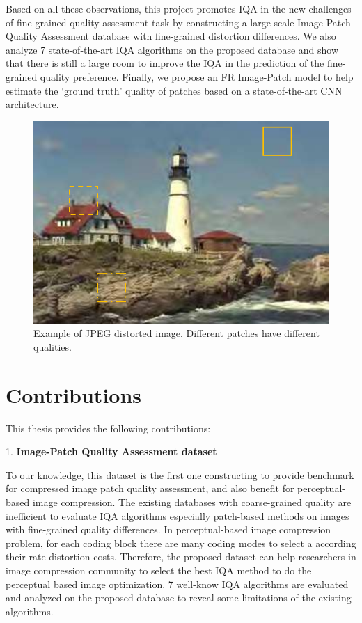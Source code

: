 Based on all these observations, this project promotes IQA in the new challenges of fine-grained quality assessment task by constructing a large-scale Image-Patch Quality Assessment database with fine-grained distortion differences. 
We also analyze 7 state-of-the-art IQA algorithms on the proposed database and show that there is still a large room to improve the IQA in the prediction of the fine-grained quality preference. 
Finally, we propose an FR Image-Patch model to help estimate the \enquote*{ground truth} quality of patches based on a state-of-the-art CNN architecture.   
   
\begin{figure}[H]
  \includegraphics[width=\linewidth]{figures/first.png}
  \caption{Example of JPEG distorted image. Different patches have different qualities.}
  \label{fig:dist-exmaple}
\end{figure}


\section{Contributions}

This thesis provides the following contributions:

1. \textbf{Image-Patch Quality Assessment dataset}

To our knowledge, this dataset is the first one constructing to provide benchmark for compressed image patch quality assessment, and also benefit for perceptual-based image compression. 
The existing databases with coarse-grained quality are inefficient to evaluate IQA algorithms especially patch-based methods on images with fine-grained quality differences. 
In perceptual-based image compression problem, for each coding block there are many coding modes to select a according their rate-distortion costs. Therefore, the proposed dataset can help researchers in image compression community to select the best IQA method to do the perceptual based image optimization. 7 well-know IQA algorithms are evaluated and analyzed on the proposed database to reveal some limitations of the existing algorithms.

